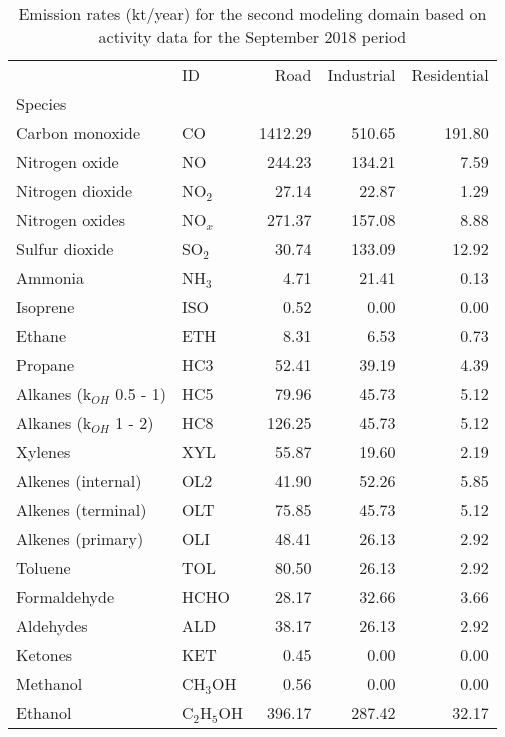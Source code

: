 \begin{table}
\centering
\caption{Emission rates (kt/year) for the second modeling domain based on activity data for the September 2018 period}
\label{tab:emi_d02}
\begin{tabular}{llrrr}
\toprule
{} &            ID &     Road &  Industrial &  Residential \\
Species                    &               &          &             &              \\
\midrule
Carbon monoxide            &            CO &  1412.29 &      510.65 &       191.80 \\
Nitrogen oxide             &            NO &   244.23 &      134.21 &         7.59 \\
Nitrogen dioxide           &        NO$_2$ &    27.14 &       22.87 &         1.29 \\
Nitrogen oxides            &        NO$_x$ &   271.37 &      157.08 &         8.88 \\
Sulfur dioxide             &        SO$_2$ &    30.74 &      133.09 &        12.92 \\
Ammonia                    &        NH$_3$ &     4.71 &       21.41 &         0.13 \\
Isoprene                   &           ISO &     0.52 &        0.00 &         0.00 \\
Ethane                     &           ETH &     8.31 &        6.53 &         0.73 \\
Propane                    &           HC3 &    52.41 &       39.19 &         4.39 \\
Alkanes (k$_{OH}$ 0.5 - 1) &           HC5 &    79.96 &       45.73 &         5.12 \\
Alkanes (k$_{OH}$ 1 - 2)   &           HC8 &   126.25 &       45.73 &         5.12 \\
Xylenes                    &           XYL &    55.87 &       19.60 &         2.19 \\
Alkenes (internal)         &           OL2 &    41.90 &       52.26 &         5.85 \\
Alkenes (terminal)         &           OLT &    75.85 &       45.73 &         5.12 \\
Alkenes (primary)          &           OLI &    48.41 &       26.13 &         2.92 \\
Toluene                    &           TOL &    80.50 &       26.13 &         2.92 \\
Formaldehyde               &          HCHO &    28.17 &       32.66 &         3.66 \\
Aldehydes                  &           ALD &    38.17 &       26.13 &         2.92 \\
Ketones                    &           KET &     0.45 &        0.00 &         0.00 \\
Methanol                   &      CH$_3$OH &     0.56 &        0.00 &         0.00 \\
Ethanol                    &  C$_2$H$_5$OH &   396.17 &      287.42 &        32.17 \\
\bottomrule
\end{tabular}
\end{table}



